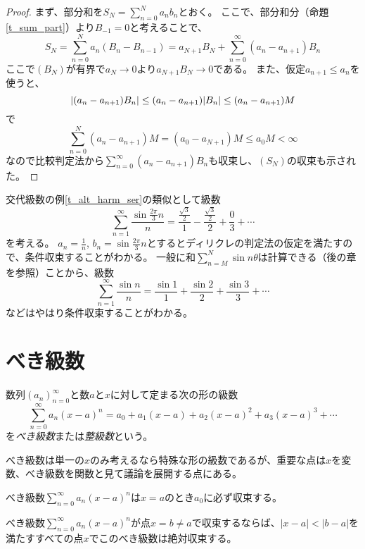 \begin{proof}
まず、部分和を$S_N = \sum_{n = 0}^N a_n b_n$とおく。
ここで、部分和分（命題\ref{t_sum_part}）より$B_{-1} = 0$と考えることで、
$$
S_N = \sum_{n = 0}^N a_n(B_n-B_{n-1}) = a_{N+1}B_N+\sum_{n = 0}^\infty (a_n-a_{n+1})B_n
$$
ここで$(B_N)$が有界で$a_N \to 0$より$a_{N+1}B_N \to 0$である。
また、仮定$a_{n+1} \le a_n$を使うと、
$$
\abs{(a_n-a_{n+1})B_n} \le (a_n-a_{n+1})\abs{B_n} \le (a_n-a_{n+1})M
$$
で
$$
\sum_{n = 0}^N (a_n-a_{n+1})M = (a_0-a_{N+1})M \le a_0 M < \infty
$$
なので比較判定法から$\sum_{n = 0}^\infty (a_n-a_{n+1})B_n$も収束し、$(S_N)$の収束も示された。
\end{proof}

\begin{example}
交代級数の例\ref{t_alt_harm_ser}の類似として級数
$$
\sum_{n = 1}^\infty \frac{\sin\frac{2\pi}{3}n}{n} = \frac{\frac{\sqrt{3}}{2}}{1}-\frac{\frac{\sqrt{3}}{2}}{2}+\frac{0}{3}+\cdots
$$
を考える。
$a_n = \frac{1}{n}$, $b_n = \sin\frac{2\pi}{3}n$とするとディリクレの判定法の仮定を満たすので、条件収束することがわかる。
一般に和$\sum_{n = M}^N \sin n\theta$は計算できる（後の章を参照）ことから、級数
$$
\sum_{n = 1}^\infty \frac{\sin n}{n} = \frac{\sin 1}{1}+\frac{\sin 2}{2}+\frac{\sin 3}{3}+\cdots
$$
などはやはり条件収束することがわかる。
\end{example}

\section{べき級数}

\begin{definition}[べき級数]
数列$(a_n)_{n = 0}^\infty$と数$a$と$x$に対して定まる次の形の級数
$$
\sum_{n = 0}^\infty a_n(x-a)^n = a_0+a_1(x-a)+a_2(x-a)^2+a_3(x-a)^3+\cdots
$$
を\emph{べき級数}または\emph{整級数}という。
\end{definition}

べき級数は単一の$x$のみ考えるなら特殊な形の級数であるが、重要な点は$x$を変数、べき級数を関数と見て議論を展開する点にある。

\begin{remark}
べき級数$\sum_{n = 0}^\infty a_n(x-a)^n$は$x = a$のとき$a_0$に必ず収束する。
\end{remark}

\begin{proposition}[べき級数の収束性]
べき級数$\sum_{n = 0}^\infty a_n(x-a)^n$が点$x = b \ne a$で収束するならば、$|x-a| < |b-a|$を満たすすべての点$x$でこのべき級数は絶対収束する。
\end{proposition}

